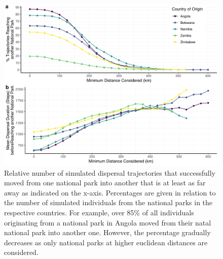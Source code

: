 \documentclass[../FinalThesis.tex]{subfiles}
\begin{document}
\begin{figure}[hbtp]
 \begin{center}
  \includegraphics[width = \textwidth]{Figures/AreasReached.png}
  \caption{Relative number of simulated dispersal trajectories that successfully
  moved from one national park into another that is at least as far away as
  indicated on the x-axis. Percentages are given in relation to the number of
  simulated individuals from the national parks in the respective countries. For
  example, over 85\% of all individuals originating from a national park in
  Angola moved from their natal national park into another one. However, the
  percentage gradually decreases as only national parks at higher euclidean
  distances are considered.}
  \label{AreasReached}
 \end{center}
\end{figure}

\end{document}
